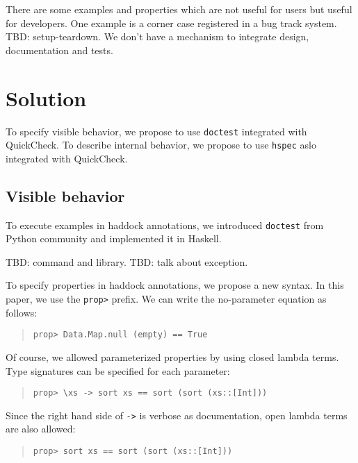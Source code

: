 \documentclass[preprint]{sigplanconf}
\begin{document}
There are some examples and properties which are not useful for users but useful for developers. One example is a corner case registered in a bug track system. TBD: setup-teardown. We don't have a mechanism to integrate design, documentation and tests.

\section{Solution}

To specify visible behavior, we propose to use {\tt doctest} integrated with QuickCheck. To describe internal behavior, we propose to use {\tt hspec} aslo integrated with QuickCheck.

\subsection{Visible behavior}

To execute examples in haddock annotations, we introduced {\tt doctest} from Python community and implemented it in Haskell.

TBD: command and library. 
TBD: talk about exception.

To specify properties in haddock annotations, we propose a new syntax. In this paper, we use the {\tt prop>} prefix. We can write the no-parameter equation as follows:

\begin{quote}
\begin{verbatim}
prop> Data.Map.null (empty) == True
\end{verbatim}
\end{quote}

\noindent Of course, we allowed parameterized properties by
using closed lambda terms.
Type signatures can be specified for each parameter:

\begin{quote}
\begin{verbatim}
prop> \xs -> sort xs == sort (sort (xs::[Int]))
\end{verbatim}
\end{quote}

\noindent Since the right hand side of {\tt ->} is verbose as documentation,
open lambda terms are also allowed:

\begin{quote}
\begin{verbatim}
prop> sort xs == sort (sort (xs::[Int]))
\end{verbatim}
\end{quote}
\end{document}
